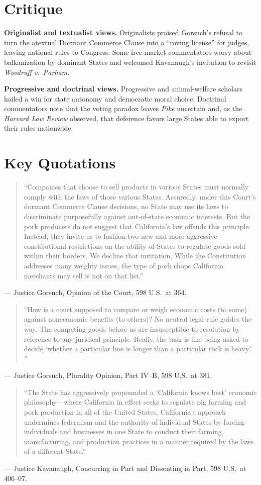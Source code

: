 \documentclass[12pt]{article}
\begin{document}
\section{Critique}

\textbf{Originalist and textualist views.} Originalists praised Gorsuch's refusal to turn the atextual Dormant Commerce Clause into a ``roving license'' for judges, leaving national rules to Congress. Some free-market commentators worry about balkanization by dominant States and welcomed Kavanaugh's invitation to revisit \textit{Woodruff v.\ Parham}.

\textbf{Progressive and doctrinal views.} Progressive and animal-welfare scholars hailed a win for state autonomy and democratic moral choice. Doctrinal commentators note that the voting paradox leaves \textit{Pike} uncertain and, as the \textit{Harvard Law Review} observed, that deference favors large States able to export their rules nationwide.

\section{Key Quotations}

\begin{quote}
``Companies that choose to sell products in various States must normally comply with the laws of those various States. Assuredly, under this Court's dormant Commerce Clause decisions, no State may use its laws to discriminate purposefully against out-of-state economic interests. But the pork producers do not suggest that California's law offends this principle. Instead, they invite us to fashion two new and more aggressive constitutional restrictions on the ability of States to regulate goods sold within their borders. We decline that invitation. While the Constitution addresses many weighty issues, the type of pork chops California merchants may sell is not on that list.''
\end{quote}
\noindent --- Justice Gorsuch, Opinion of the Court, 598 U.S.\ at 364.

\begin{quote}
``How is a court supposed to compare or weigh economic costs (to some) against noneconomic benefits (to others)? No neutral legal rule guides the way. The competing goods before us are insusceptible to resolution by reference to any juridical principle. Really, the task is like being asked to decide `whether a particular line is longer than a particular rock is heavy.' ''
\end{quote}
\noindent --- Justice Gorsuch, Plurality Opinion, Part IV--B, 598 U.S.\ at 381.

\begin{quote}\sloppy
``The State has aggressively propounded a `California knows best' economic philosophy---where California in effect seeks to regulate pig farming and pork production in all of the United States. California's approach undermines federalism and the authority of individual States by forcing individuals and businesses in one State to conduct their farming, manufacturing, and production practices in a manner required by the laws of a different State.''
\end{quote}
\noindent --- Justice Kavanaugh, Concurring in Part and Dissenting in Part, 598 U.S.\ at 406--07.
\end{document}
